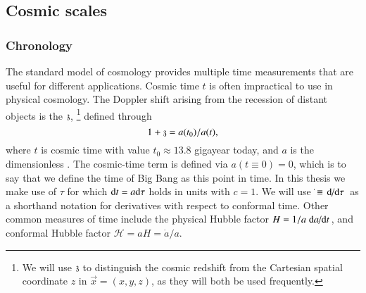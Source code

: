 \subsection{Cosmic scales}



    \subsubsection{Chronology}
    The standard model of cosmology provides multiple time measurements that are useful for different applications. 
    Cosmic time $t$ is often impractical to use in physical cosmology. The Doppler shift arising from the recession of distant objects is the  $\mathfrak{z}$,%
    \footnote{
        We will use $\mathfrak{z}$ to distinguish the cosmic redshift from the Cartesian spatial coordinate $z$ in $\vec{x}=(x,y,z)$, as they will both be used frequently.
    } %
    defined through
    \begin{equation}
        1 + \mathfrak{z} = a(t_0)/a(t),
    \end{equation}
    where $t$ is cosmic time with value $t_0\approx 13.8$ gigayear today, and $a$ is the dimensionless . The cosmic-time term is defined via $a(t\equiv 0)= 0$, which is to say that we define the time of Big Bang as this point in time. 
    In this thesis we make use of  $\tau$ for which ${\diff t} = a {\diff \tau}$ holds %
    in units with $c=1$. We will use $\dot{}\equiv\dv*{}{\tau}$ as a shorthand notation for derivatives with respect to conformal time. %
    Other common measures of time include the physical Hubble factor $H=1/a \dv*{a}{t}$, and conformal Hubble factor $\mathcal{H}= aH = \dot{a}/a$.

